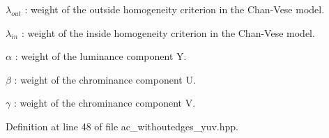 \begin{DoxyItemize}
\item $\lambda _{out}$ \-: weight of the outside homogeneity criterion in the Chan-\/\-Vese model. \par

\item $\lambda _{in}$ \-: weight of the inside homogeneity criterion in the Chan-\/\-Vese model. \par

\item $\alpha$ \-: weight of the luminance component Y. \par

\item $\beta$ \-: weight of the chrominance component U. \par

\item $\gamma$ \-: weight of the chrominance component V. 
\end{DoxyItemize}

Definition at line 48 of file ac\-\_\-withoutedges\-\_\-yuv.\-hpp.



